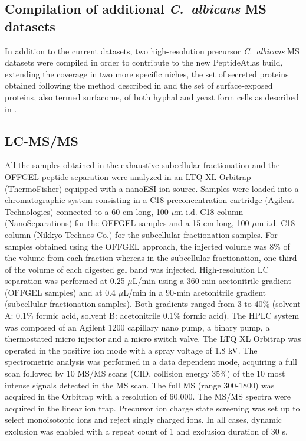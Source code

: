 \subsection*{Compilation of additional \textit{\mbox{C. albicans}} MS datasets}

In addition to the current datasets, two high-resolution precursor \textit{\mbox{C. albicans}} MS datasets
were compiled in order to contribute to the new PeptideAtlas build, extending the coverage in
two more specific niches, the set of secreted proteins obtained following the method
described in \citep{Gil-Bona2015a} and the set of surface-exposed proteins, also termed surfacome, of both
hyphal and yeast form cells as described in \citep{Gil-Bona2015}.


\subsection*{LC-MS/MS}

All the samples obtained in the exhaustive subcellular fractionation and the OFFGEL peptide
separation were analyzed in an LTQ XL Orbitrap (ThermoFisher) equipped with a nanoESI
ion source. Samples were loaded into a chromatographic system consisting in a C18
preconcentration cartridge (Agilent Technologies) connected to a 60 cm long, 100 $\mu$m i.d.
C18 column (NanoSeparations) for the OFFGEL samples and a 15 cm long, 100 $\mu$m i.d. C18
column (Nikkyo Technos Co.) for the subcellular fractionation samples.
For samples obtained using the OFFGEL approach, the injected volume was 8\% of the
volume from each fraction whereas in the subcellular fractionation, one-third of the volume of
each digested gel band was injected.
High-resolution LC separation was performed at 0.25 $\mu$L/min using a 360-min acetonitrile
gradient (OFFGEL samples) and at 0.4 $\mu$L/min in a 90-min acetonitrile gradient (subcellular
fractionation samples). Both gradients ranged from 3 to 40\% (solvent A: 0.1\% formic acid,
solvent B: acetonitrile 0.1\% formic acid). The HPLC system was composed of an Agilent
1200 capillary nano pump, a binary pump, a thermostated micro injector and a micro switch
valve. The LTQ XL Orbitrap was operated in the positive ion mode with a spray voltage of 1.8
kV. The spectrometric analysis was performed in a data dependent mode, acquiring a full
scan followed by 10 MS/MS scans (CID, collision energy 35\%) of the 10 most intense signals
detected in the MS scan. The full MS (range 300-1800) was acquired in the Orbitrap with a
resolution of 60.000. The MS/MS spectra were acquired in the linear ion trap. Precursor ion
charge state screening was set up to select monoisotopic ions and reject singly charged
ions. In all cases, dynamic exclusion was enabled with a repeat count of 1 and exclusion
duration of 30 s.


